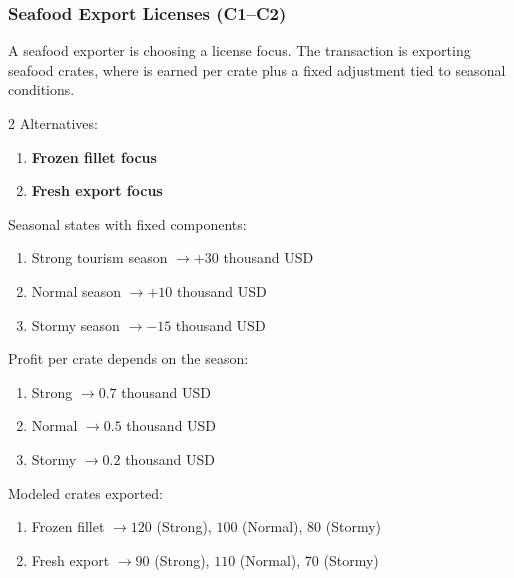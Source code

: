 
	\subsubsection{Seafood Export Licenses (C1--C2)}
	\label{sec:problem23-seafood-export-licenses-c1-c2}
	A seafood exporter is choosing a license focus. The transaction is exporting seafood crates, where  is earned per crate plus a fixed  adjustment tied to seasonal conditions.

	\begin{multicols}{2}
		Alternatives:
		\begin{enumerate}[label=\arabic*.]
			\item \textbf{Frozen fillet focus}
			\item \textbf{Fresh export focus}
		\end{enumerate}

		Seasonal states with fixed  components:
		\begin{enumerate}[label=\arabic*.]
			\item Strong tourism season $\to +30$ thousand USD
			\item Normal season $\to +10$ thousand USD
			\item Stormy season $\to -15$ thousand USD
		\end{enumerate}

			\columnbreak

		Profit per crate depends on the season:
		\begin{enumerate}[label=\arabic*.]
			\item Strong $\to 0.7$ thousand USD
			\item Normal $\to 0.5$ thousand USD
			\item Stormy $\to 0.2$ thousand USD
		\end{enumerate}

		Modeled crates exported:
		\begin{enumerate}[label=\arabic*.]
			\item Frozen fillet $\to 120$ (Strong), $100$ (Normal), $80$ (Stormy)
			\item Fresh export $\to 90$ (Strong), $110$ (Normal), $70$ (Stormy)
		\end{enumerate}
	\end{multicols}

